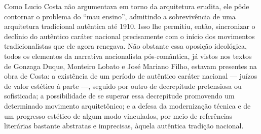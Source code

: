 Como Lucio Costa não argumentava em torno da arquitetura erudita, ele
pôde contornar o problema do ``mau ensino'', admitindo a sobrevivência
de uma arquitetura tradicional autêntica até 1910. Isso lhe permitiu,
então, sincronizar o declínio do autêntico caráter nacional precisamente
com o início dos movimentos tradicionalistas que ele agora renegava. Não
obstante essa oposição ideológica, todos os elementos da narrativa
nacionalista pós-romântica, já vistos nos textos de Gonzaga Duque,
Monteiro Lobato e José Mariano Filho, estavam presentes na obra de
Costa: a existência de um período de autêntico caráter nacional ---
juízos de valor estético à parte ---, seguido por outro de decrepitude
pretensiosa ou sofisticada; a possibilidade de se superar essa
decrepitude promovendo um determinado movimento arquitetônico; e a
defesa da modernização técnica e de um progresso estético de algum modo
vinculados, por meio de referências literárias bastante abstratas e
imprecisas, àquela autêntica tradição nacional.
